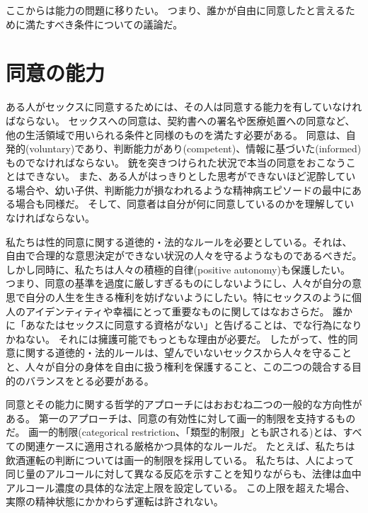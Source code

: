 \documentclass[paper=a4,book,openany]{jlreq}
\begin{document}
ここからは能力の問題に移りたい。
つまり、誰かが自由に同意したと言えるために満たすべき条件についての議論だ。

\section{同意の能力}

ある人がセックスに同意するためには、その人は同意する能力を有していなければならない。
セックスへの同意は、契約書への署名や医療処置への同意など、他の生活領域で用いられる条件と同様のものを満たす必要がある。
同意は、自発的(voluntary)であり、判断能力があり(competent)、情報に基づいた(informed)ものでなければならない。
銃を突きつけられた状況で本当の同意をおこなうことはできない。
また、ある人がはっきりとした思考ができないほど泥酔している場合や、幼い子供、判断能力が損なわれるような精神病エピソードの最中にある場合も同様だ。
そして、同意者は自分が何に同意しているのかを理解していなければならない。

私たちは性的同意に関する道徳的・法的なルールを必要としている。それは、
自由で合理的な意思決定ができない状況の人々を守るようなものであるべきだ。
しかし同時に、私たちは人々の積極的自律(positive autonomy)も保護したい。
つまり、同意の基準を過度に厳しすぎるものにしないようにし、人々が自分の意思で自分の人生を生きる権利を妨げないようにしたい。特にセックスのように個人のアイデンティティや幸福にとって重要なものに関してはなおさらだ。
誰かに「あなたはセックスに同意する資格がない」と告げることは、でな行為になりかねない。
それには擁護可能でもっともな理由が必要だ。
したがって、性的同意に関する道徳的・法的ルールは、望んでいないセックスから人々を守ることと、人々が自分の身体を自由に扱う権利を保護すること、この二つの競合する目的のバランスをとる必要がある。

同意とその能力に関する哲学的アプローチにはおおむね二つの一般的な方向性がある。
第一のアプローチは、同意の有効性に対して画一的制限を支持するものだ。
画一的制限(categorical restriction、「類型的制限」とも訳される)とは、すべての関連ケースに適用される厳格かつ具体的なルールだ。
たとえば、私たちは飲酒運転の判断については画一的制限を採用している。
私たちは、人によって同じ量のアルコールに対して異なる反応を示すことを知りながらも、法律は血中アルコール濃度の具体的な法定上限を設定している。
この上限を超えた場合、実際の精神状態にかかわらず運転は許されない。
\end{document}
